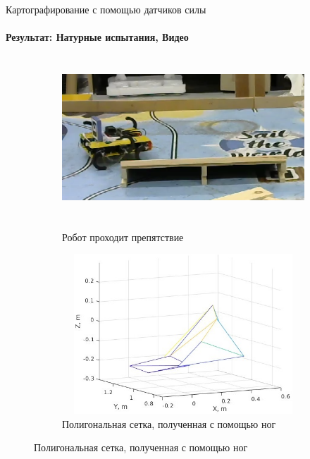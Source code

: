\documentclass[aspectratio=169,xcolor=table]{beamer}
\begin{document}
\begin{frame}[t]{Картографирование с помощью датчиков силы}
    \framesubtitle{Результат: Натурные испытания, Видео}
    \vspace{-0.5cm}
    \begin{figure}[H]
        \begin{subfigure}[t]{0.49\textwidth}
            \href{https://youtu.be/2dxHHTG4psQ}{
                \centering\includegraphics[height=6cm,width=1\textwidth,keepaspectratio]{real_robot_mesh_video_preview.png}}
            \caption*{Робот проходит препятствие}
        \end{subfigure}
        \begin{subfigure}[t]{0.49\textwidth}
            \centering\includegraphics[height=6cm,width=1\textwidth,keepaspectratio]{real_mesh.jpg}
            \caption*{Полигональная сетка, полученная с помощью ног}
        \end{subfigure}
    \end{figure}
\end{frame}
\end{document}
